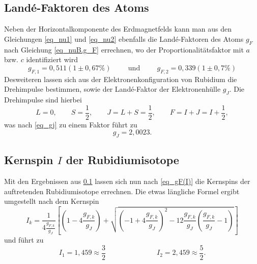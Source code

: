 \subsection{Landé-Faktoren des Atoms}
\label{sec_lande}
Neben der Horizontalkomponente des Erdmagnetfelds kann man aus den Gleichungen \eqref{eq_nu1} und \eqref{eq_nu2} ebenfalls die Landé-Faktoren des
Atoms $g_F$ nach Gleichung \eqref{eq_nuB.g_F} errechnen, wo der Proportionalitätsfaktor mit $a$ bzw. $c$ identifiziert wird
\begin{equation}
 g_{F,1} = 0,511(1 \pm 0,67\%) \hspace{1cm}\text{und}\hspace{1cm}g_{F,2} = 0,339(1\pm 0,7\%) 
\end{equation}
Desweiteren lassen sich aus der Elektronenkonfiguration von Rubidium die Drehimpulse bestimmen, sowie der Landé-Faktor der Elektronenhülle $g_J$.
Die Drehimpulse sind hierbei
\begin{equation}
 L = 0 , \qquad S=\frac12 , \qquad J = L+S = \frac12, \qquad F = I+J= I + \frac12,
\end{equation}
was nach \eqref{eq_gj} zu einem Faktor führt zu
\begin{equation}
 g_J = 2,0023. 
\end{equation}

\subsection{Kernspin $I$ der Rubidiumisotope}
Mit den Ergebnissen aus \ref{sec_lande} lassen sich nun nach \eqref{eq_gF(I)} die Kernspins der auftretenden Rubidiumisotope errechnen. Die etwas
längliche Formel ergibt umgestellt nach dem Kernspin
\begin{equation}
 I_k = \frac{1}{4\frac{g_{F,k}}{g_J}} \left[\left(1-4\frac{g_{F,k}}{g_J}\right) + \sqrt{\left(-1+4\frac{g_{F,k}}{g_J}\right)^2-12\frac{g_{F,k}}{g_J}\left(\frac{g_{F,k}}{g_J}-1\right)}\right]
\end{equation}
und führt zu
\begin{equation}
 I_1 = 1,459 \approx \frac32 \hspace{3cm} I_2=	2,459 \approx \frac52.
\end{equation}

